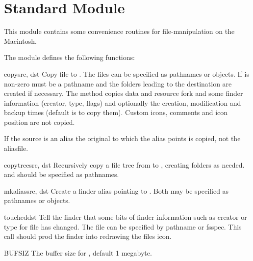 \section{Standard Module }
\label{module-macostools}

This module contains some convenience routines for file-manipulation
on the Macintosh.

The  module defines the following functions:


\begin{funcdesc}{copy}{src, dst}
Copy file  to . The files can be specified as
pathnames or  objects. If  is non-zero
 must be a pathname and the folders leading to the
destination are created if necessary.  The method copies data and
resource fork and some finder information (creator, type, flags) and
optionally the creation, modification and backup times (default is to
copy them). Custom icons, comments and icon position are not copied.

If the source is an alias the original to which the alias points is
copied, not the aliasfile.
\end{funcdesc}

\begin{funcdesc}{copytree}{src, dst}
Recursively copy a file tree from  to , creating
folders as needed.  and  should be specified as
pathnames.
\end{funcdesc}

\begin{funcdesc}{mkalias}{src, dst}
Create a finder alias  pointing to . Both may be
specified as pathnames or  objects.
\end{funcdesc}

\begin{funcdesc}{touched}{dst}
Tell the finder that some bits of finder-information such as creator
or type for file  has changed. The file can be specified by
pathname or fsspec. This call should prod the finder into redrawing the
files icon.
\end{funcdesc}

\begin{datadesc}{BUFSIZ}
The buffer size for , default 1 megabyte.
\end{datadesc}

